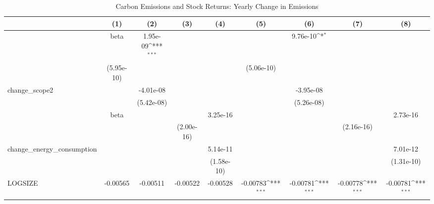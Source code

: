 \begin{table}[htbp]\centering
\def\sym#1{\ifmmode^{#1}\else\(^{#1}\)\fi}
\caption{Carbon Emissions and Stock Returns: Yearly Change in Emissions}
\begin{tabular}{l*{8}{c}}
\hline\hline
                    &\multicolumn{1}{c}{(1)}         &\multicolumn{1}{c}{(2)}         &\multicolumn{1}{c}{(3)}         &\multicolumn{1}{c}{(4)}         &\multicolumn{1}{c}{(5)}         &\multicolumn{1}{c}{(6)}         &\multicolumn{1}{c}{(7)}         &\multicolumn{1}{c}{(8)}         \\
\hline
{&beta}             &    1.95e-09\sym{***}&                     &                     &                     &    9.76e-10\sym{*}  &                     &                     &                     \\
                    &  (5.95e-10)         &                     &                     &                     &  (5.06e-10)         &                     &                     &                     \\
change\_scope2       &                     &   -4.01e-08         &                     &                     &                     &   -3.95e-08         &                     &                     \\
                    &                     &  (5.42e-08)         &                     &                     &                     &  (5.26e-08)         &                     &                     \\
{&beta}             &                     &                     &    3.25e-16         &                     &                     &                     &    2.73e-16         &                     \\
                    &                     &                     &  (2.00e-16)         &                     &                     &                     &  (2.16e-16)         &                     \\
change\_energy\_consumption&                     &                     &                     &    5.14e-11         &                     &                     &                     &    7.01e-12         \\
                    &                     &                     &                     &  (1.58e-10)         &                     &                     &                     &  (1.31e-10)         \\
LOGSIZE             &    -0.00565         &    -0.00511         &    -0.00522         &    -0.00528         &    -0.00783\sym{***}&    -0.00781\sym{***}&    -0.00778\sym{***}&    -0.00781\sym{***}\\

\end{tabular}
\end{table}
